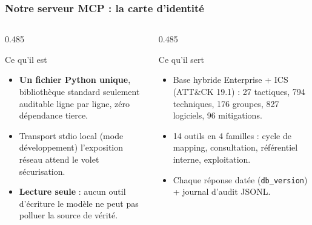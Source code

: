 \documentclass[aspectratio=169,11pt]{beamer}
\begin{document}
\begin{frame}
  \frametitle{Notre serveur MCP : la carte d'identité}
  \vspace{0.05cm}
  \begin{columns}[T]
    \begin{column}{0.485\textwidth}
      \begin{exampleblock}{Ce qu'il est}
        \footnotesize
        \begin{itemize}\setlength\itemsep{0.3em}
          \item \textbf{Un fichier Python unique}, bibliothèque standard
            seulement auditable ligne par ligne, zéro dépendance tierce.
          \item Transport stdio local (mode développement) 
            l'exposition réseau attend le volet sécurisation.
          \item \textbf{Lecture seule} : aucun outil d'écriture le modèle
            ne peut pas polluer la source de vérité.
        \end{itemize}
      \end{exampleblock}
    \end{column}
    \begin{column}{0.485\textwidth}
      \begin{block}{Ce qu'il sert}
        \footnotesize
        \begin{itemize}\setlength\itemsep{0.3em}
          \item Base hybride Enterprise + ICS (ATT\&CK 19.1) :
            27 tactiques, 794 techniques, 176 groupes, 827 logiciels,
            96 mitigations.
          \item 14 outils en 4 familles : cycle de mapping,
            consultation, référentiel interne, exploitation.
          \item Chaque réponse datée (\texttt{db\_version}) + journal
            d'audit JSONL.
        \end{itemize}
      \end{block}
    \end{column}
  \end{columns}
  \vspace{0.25cm}
  \begin{center}
  \end{center}
\end{frame}
 
\end{document}
